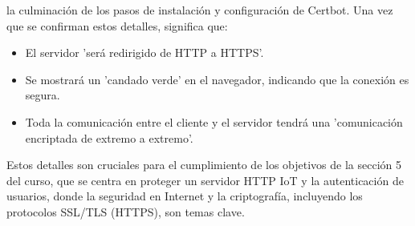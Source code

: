 \documentclass{report}
\begin{document}
la culminación de los pasos de instalación y configuración de Certbot. Una vez que se confirman estos detalles, significa que:
\begin{itemize}
    \item El servidor 'será redirigido de HTTP a HTTPS'.
    \item Se mostrará un 'candado verde' en el navegador, indicando que la conexión es segura.
    \item Toda la comunicación entre el cliente y el servidor tendrá una 'comunicación encriptada de extremo a extremo'.
\end{itemize}
Estos detalles son cruciales para el cumplimiento de los objetivos de la sección 5 del curso, que se centra en proteger un servidor HTTP IoT 
y la autenticación de usuarios, donde la seguridad en Internet y la criptografía, incluyendo los protocolos SSL/TLS (HTTPS), son temas clave.
\end{document}
